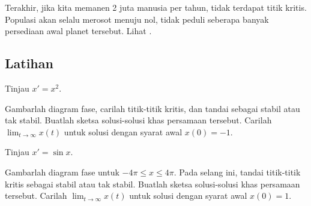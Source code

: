 Terakhir, jika kita memanen 2 juta manusia per tahun, tidak terdapat
titik kritis.
Populasi
akan selalu merosot menuju nol, tidak peduli seberapa banyak persediaan awal planet tersebut.
Lihat .

\begin{myfig}
\capstart
{}
\caption{Medan kemiringan dan beberapa solusi dari
$x' = 0.1\,x\,(8-x)-2$.\label{2.2:harv2}}
\end{myfig}


\subsection{Latihan}

\begin{samepage}
\begin{exercise}
Tinjau $x' = x^2$.
\begin{tasks}
\task Gambarlah diagram fase,
carilah titik-titik kritis, dan tandai sebagai stabil atau tak stabil.
\task Buatlah sketsa solusi-solusi khas persamaan tersebut.
\task Carilah $\displaystyle \lim_{t\to \infty} x(t)$ untuk solusi dengan syarat awal
$x(0) = -1$.
\end{tasks}
\end{exercise}
\end{samepage}

\begin{exercise}
Tinjau $x' = \sin x$.
\begin{tasks}
\task Gambarlah diagram fase untuk $-4\pi \leq x \leq 4\pi$.  Pada selang ini,
tandai titik-titik kritis sebagai stabil atau tak stabil.
\task Buatlah sketsa solusi-solusi khas persamaan tersebut.
\task Carilah $\displaystyle \lim_{t\to \infty} x(t)$ untuk solusi dengan syarat awal
$x(0) = 1$.
\end{tasks}
\end{exercise}

